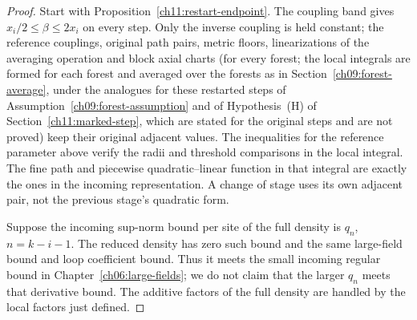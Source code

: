 \begin{proof}
Start with Proposition~\ref{ch11:restart-endpoint}.
The coupling band gives $x_i/2\le\beta\le2x_i$ on every step.
Only the inverse coupling is held constant; the reference couplings, original path pairs,
metric floors, linearizations of the averaging operation and block axial charts (for every forest; the local integrals are formed for each forest and averaged over the forests as in Section~\ref{ch09:forest-average}, under the analogues for these restarted steps of Assumption~\ref{ch09:forest-assumption} and of Hypothesis~(H) of Section~\ref{ch11:marked-step}, which are stated for the original steps and are not proved) keep their
original adjacent values. The inequalities for the reference parameter above
verify the radii and threshold comparisons in the local integral.
The fine path and piecewise quadratic--linear function in that integral are exactly the ones in the
incoming representation. A change of stage uses its own adjacent pair,
not the previous stage's quadratic form.

Suppose the incoming sup-norm bound per site of the full density is $q_n$, $n=k-i-1$.
The reduced density has zero such bound and the same large-field
bound and loop coefficient bound. Thus it meets the small incoming
regular bound in Chapter~\ref{ch06:large-fields}; we do not claim
that the larger $q_n$ meets that derivative bound. The additive
factors of the full density are handled by the local factors just defined.


\end{proof}
